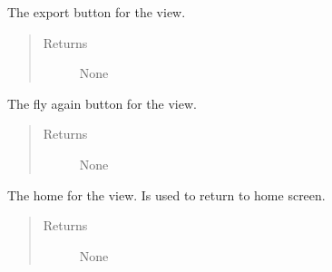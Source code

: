 \documentclass[letterpaper,10pt,english]{sphinxmanual}
\begin{document}
\begin{fulllineitems}

\begin{fulllineitems}
\label{\detokenize{index:src.Views.View_ReportScreen.ReportWindow.del_BtnExport}}
The export button for the view.
\begin{quote}\begin{description}
\item[{Returns}] \leavevmode
None

\end{description}\end{quote}

\end{fulllineitems}


\begin{fulllineitems}
\label{\detokenize{index:src.Views.View_ReportScreen.ReportWindow.del_BtnFlyAgain}}
The fly again button for the view.
\begin{quote}\begin{description}
\item[{Returns}] \leavevmode
None

\end{description}\end{quote}

\end{fulllineitems}


\begin{fulllineitems}
\label{\detokenize{index:src.Views.View_ReportScreen.ReportWindow.del_BtnHome}}
The home for the view. Is used to return to home screen.
\begin{quote}\begin{description}
\item[{Returns}] \leavevmode
None


\end{description}
\end{quote}
\end{fulllineitems}
\end{fulllineitems}
\end{document}
